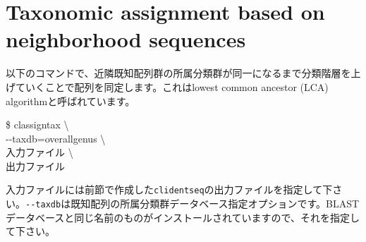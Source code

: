 \documentclass[titlepage,10pt,a4paper,english]{jsbook}
\newenvironment{cmd}{\begin{oframed}\raggedright\ttfamily\footnotesize\setlength{\baselineskip}{1.4em}}{\end{oframed}\vspace{-1em}}
\begin{document}
\section{Taxonomic assignment based on neighborhood sequences}
以下のコマンドで、近隣既知配列群の所属分類群が同一になるまで分類階層を上げていくことで配列を同定します。これはlowest common ancestor (LCA) algorithmと呼ばれています\citep{Huson2007}。
\begin{cmd}
\$ classigntax {\textbackslash}\\
{-}{-}taxdb=overall{\textunderscore}genus {\textbackslash}\\
入力ファイル {\textbackslash}\\
出力ファイル
\end{cmd}
入力ファイルには前節で作成した\texttt{clidentseq}の出力ファイルを指定して下さい。\texttt{{-}{-}taxdb}は既知配列の所属分類群データベース指定オプションです。BLASTデータベースと同じ名前のものがインストールされていますので、それを指定して下さい。
\end{document}
